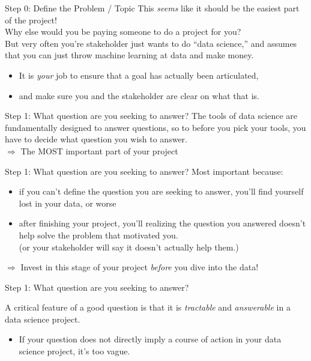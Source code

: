 \documentclass[11pt]{beamer}
\begin{document}
\begin{frame}[c]{Step 0: Define the \alert{Problem / Topic}}
This \emph{seems} like it should be the easiest part of the project! \\
\pause Why else would you be paying someone to do a project for you? \\

\vspace*{0.2cm}
\pause But very often you're stakeholder just wants to do ``data science,'' and assumes that you can just throw machine learning at data and make money. \\
\begin{itemize}
    \pause \item It is \emph{your} job to ensure that a goal has actually been articulated,
    \item and make sure you and the stakeholder are clear on what that is.
\end{itemize}
\end{frame}

\begin{frame}[c]{Step 1: What \alert{question} are you seeking to answer?}
The tools of data science are fundamentally designed to \alert{answer questions}, \pause so to before you pick your tools, you have to decide \alert{what question you wish to answer.}\\
\vspace*{0.1cm}
\pause $\Rightarrow$ The MOST important part of your project\\
\end{frame}

\begin{frame}[c]{Step 1: What \alert{question} are you seeking to answer?}
Most important because:

\begin{itemize}
  \pause \item if you can't define the question you are seeking to answer, \alert{you'll find yourself lost in your data}, or worse
  \pause \item after finishing your project, you'll realizing the question you answered doesn't help solve the problem that motivated you. \\
 (or your stakeholder will say it doesn't actually help them.)
\end{itemize}
\pause  $\Rightarrow$ Invest in this stage of your project \emph{before} you dive into the data!
\end{frame}


\begin{frame}[c]{Step 1: What \alert{question} are you seeking to answer?}

A critical feature of a good question is that it is \emph{tractable} and \emph{answerable} in a data science project. \\
\begin{itemize}
  \item If your question does not directly imply a course of action in your data science project, it's too vague.
\end{itemize}
\end{frame}
\end{document}
